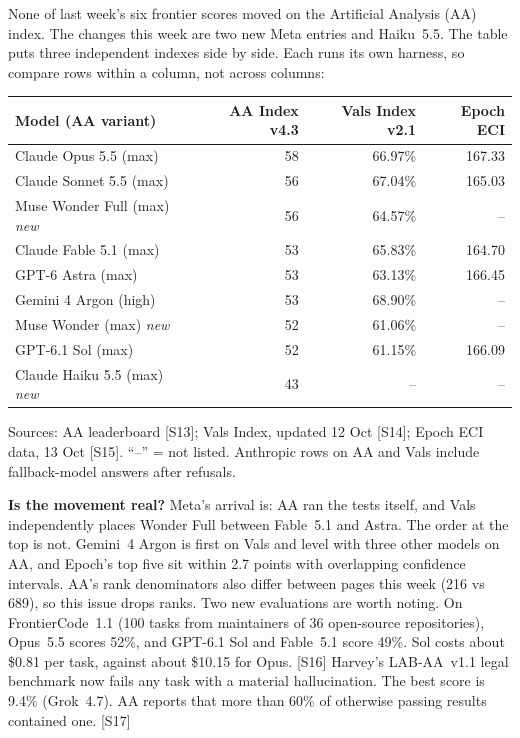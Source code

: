 \documentclass[11pt,a4paper]{article}
\newcommand{\srcref}[1]{\textcolor{brandaccent}{[S#1]}}
\begin{document}
None of last week's six frontier scores moved on the Artificial Analysis (AA) index. The changes
this week are two new Meta entries and Haiku~5.5. The table puts three independent indexes side by side.
Each runs its own harness, so compare rows within a column, not across columns:

{\small
\begin{tabularx}{\textwidth}{@{}X r r r@{}}
\toprule
\textbf{Model (AA variant)} & \textbf{AA Index v4.3} & \textbf{Vals Index v2.1} & \textbf{Epoch ECI} \\
\midrule
Claude Opus 5.5 (max)        & 58 & 66.97\% & 167.33 \\
Claude Sonnet 5.5 (max)      & 56 & 67.04\% & 165.03 \\
Muse Wonder Full (max) \emph{new} & 56 & 64.57\% & -- \\
Claude Fable 5.1 (max)       & 53 & 65.83\% & 164.70 \\
GPT-6 Astra (max)            & 53 & 63.13\% & 166.45 \\
Gemini 4 Argon (high)        & 53 & 68.90\% & -- \\
Muse Wonder (max) \emph{new} & 52 & 61.06\% & -- \\
GPT-6.1 Sol (max)            & 52 & 61.15\% & 166.09 \\
Claude Haiku 5.5 (max) \emph{new} & 43 & -- & -- \\
\bottomrule
\end{tabularx}}
\par\vspace{0.2em}
{\footnotesize\color{brandgrey}Sources: AA leaderboard \srcref{13}; Vals Index, updated 12 Oct \srcref{14};
Epoch ECI data, 13 Oct \srcref{15}. ``--'' = not listed. Anthropic rows on AA and Vals include
fallback-model answers after refusals.}
\vspace{0.3em}

\textbf{Is the movement real?} Meta's arrival is: AA ran the tests itself, and Vals independently
places Wonder Full between Fable~5.1 and Astra. The order at the top is not. Gemini~4 Argon is first on Vals and
level with three other models on AA, and Epoch's top five sit within 2.7 points with overlapping
confidence intervals. AA's rank denominators also differ between pages this week (216 vs 689), so
this issue drops ranks. Two new evaluations are worth noting. On FrontierCode~1.1 (100 tasks from
maintainers of 36 open-source repositories), Opus~5.5 scores 52\%, and GPT-6.1 Sol and Fable~5.1 score 49\%. Sol costs about
\$0.81 per task, against about \$10.15 for Opus. \srcref{16} Harvey's LAB-AA~v1.1 legal benchmark now fails
any task with a material hallucination. The best score is 9.4\% (Grok~4.7). AA reports that more than 60\% of otherwise
passing results contained one. \srcref{17}
\end{document}
